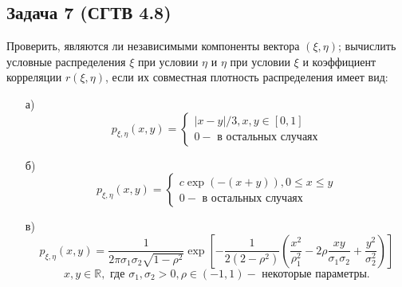 \subsection*{Задача 7 (СГТВ 4.8)}

Проверить, являются ли независимыми компоненты вектора $(\xi, \eta)$; вычислить условные распределения $\xi$ при условии $\eta$ и $\eta$ при условии $\xi$ и коэффициент корреляции $r(\xi, \eta)$, если их совместная плотность распределения имеет вид:
\begin{enumerate}
	\item[а)]
	\[
	p_{\xi, \eta} (x, y) =
	\begin{cases}
		|x-y|/3, x,y \in [0,1] \\
		0 - \text{ в остальных случаях}
	\end{cases}
	\]
	\item[б)]
	\[
	p_{\xi, \eta} (x, y) =
	\begin{cases}
		c \exp (- (x + y)), 0 \le x \le y \\
		0 - \text{ в остальных случаях}
	\end{cases}
	\]
	\item[в)]
	\[
	p_{\xi, \eta} (x, y) =
	\frac{1}{2 \pi \sigma_1 \sigma_2 \sqrt{1 - \rho^2}} \exp \left[ - \frac{1}{2 (2 - \rho^2)} \left( \frac{x^2}{\rho_1^2} - 2 \rho \frac{xy}{\sigma_1 \sigma_2} + \frac{y^2}{\sigma_2^2} \right) \right]
	\]
	\[ x, y \in \mathbb{R}, \text{ где } \sigma_1, \sigma_2 > 0, \rho \in (-1, 1) - \text{ некоторые параметры.} \]
\end{enumerate}

 